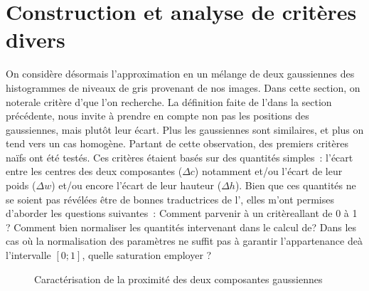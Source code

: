 \documentclass[main.tex]{subfiles}
\begin{document}
\section{Construction et analyse de critères divers}
On considère désormais l'approximation en un mélange de deux gaussiennes des histogrammes de niveaux de gris provenant de nos images. Dans cette section, on notera\HH le critère d'\hetero que l'on recherche. 
La définition faite de l'\hetero dans la section précédente, nous invite à prendre en compte non pas les positions des gaussiennes, mais plutôt leur écart. Plus les gaussiennes sont similaires, et plus on tend vers un cas homogène. Partant de cette observation, 
des premiers critères naïfs ont été testés. Ces critères étaient basés sur des quantités simples~:  l'écart entre les centres des deux composantes ($\Delta c$) notamment et/ou l'écart de leur poids  ($\Delta w$) et/ou encore l'écart de leur hauteur ($\Delta h$). Bien que ces quantités ne se soient pas révélées être de bonnes traductrices de l'\hetero, elles m'ont permises d'aborder les questions suivantes~:
Comment parvenir à un critère\HH allant de 0 à 1 ? Comment bien normaliser les quantités intervenant dans le calcul de\HH ? Dans les cas où la normalisation des paramètres ne suffit pas à garantir l'appartenance de\HH à l'intervalle $[0;1]$, quelle saturation employer ? 

\begin{figure}
\centering
{} 
\caption{Caractérisation de la proximité des deux composantes gaussiennes}
\end{figure}
\end{document}
